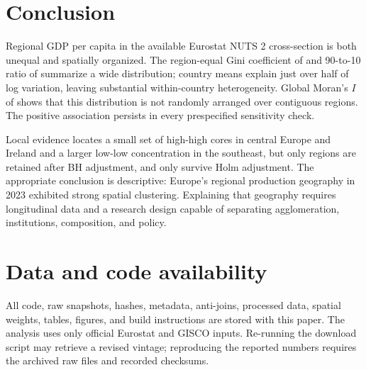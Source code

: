 \documentclass[11pt,a4paper]{article}
\begin{document}
\section{Conclusion}

Regional GDP per capita in the available Eurostat NUTS 2 cross-section is both
unequal and spatially organized. The region-equal Gini coefficient of
\GiniGDP{} and 90-to-10 ratio of \PninetyTen{} summarize a wide distribution;
country means explain just over half of log variation, leaving substantial
within-country heterogeneity. Global Moran's $I$ of \MoranI{} shows that this
distribution is not randomly arranged over contiguous regions. The positive
association persists in every prespecified sensitivity check.

Local evidence locates a small set of high-high cores in central Europe and
Ireland and a larger low-low concentration in the southeast, but only
\LISAFDRTotal{} regions are retained after BH adjustment, and only
\LISAHolmTotal{} survive Holm adjustment. The appropriate conclusion is
descriptive: Europe's regional production geography in 2023 exhibited strong
spatial clustering. Explaining that geography requires longitudinal data and
a research design capable of separating agglomeration, institutions,
composition, and policy.

\section*{Data and code availability}

All code, raw snapshots, hashes, metadata, anti-joins, processed data, spatial
weights, tables, figures, and build instructions are stored with this paper.
The analysis uses only official Eurostat and GISCO inputs. Re-running the
download script may retrieve a revised vintage; reproducing the reported
numbers requires the archived raw files and recorded checksums.

\clearpage


\end{document}

